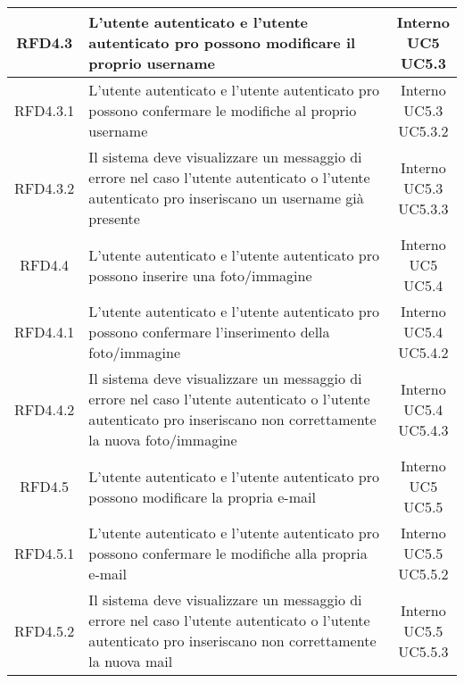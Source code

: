 \begin{longtable}{|c|>{\centering}m{7cm}|c|}
			 \hypertarget{{RFD4.3}}{{RFD4.3}} & L’utente autenticato e l’utente autenticato pro possono modificare il proprio username & \makecell{Interno\\ UC5 \\UC5.3 } \\ \hline
			 \hypertarget{{RFD4.3.1}}{{RFD4.3.1}} &  L’utente autenticato e l’utente autenticato pro possono confermare le modifiche al proprio username & \makecell{Interno\\ UC5.3 \\UC5.3.2 } \\ \hline
			 \hypertarget{{RFD4.3.2}}{{RFD4.3.2}} & Il sistema deve visualizzare un messaggio di errore nel caso l’utente autenticato o l’utente autenticato pro inseriscano un username già presente & \makecell{Interno\\ UC5.3 \\UC5.3.3 } \\ \hline
			 \hypertarget{{RFD4.4}}{{RFD4.4}} & L’utente autenticato e l’utente autenticato pro possono inserire una foto/immagine  & \makecell{Interno\\ UC5 \\UC5.4 } \\ \hline
			 \hypertarget{{RFD4.4.1}}{{RFD4.4.1}} & L’utente autenticato e l’utente autenticato pro possono confermare l’inserimento della foto/immagine & \makecell{Interno\\ UC5.4 \\UC5.4.2 } \\ \hline
			 \hypertarget{{RFD4.4.2}}{{RFD4.4.2}} & Il sistema deve visualizzare un messaggio di errore nel caso l’utente autenticato o l’utente autenticato pro inseriscano non correttamente la nuova foto/immagine & \makecell{Interno\\ UC5.4 \\UC5.4.3 } \\ \hline
			 \hypertarget{{RFD4.5}}{{RFD4.5}} & L’utente autenticato e l’utente autenticato pro possono modificare la propria e-mail  & \makecell{Interno\\ UC5 \\UC5.5 } \\ \hline
			 \hypertarget{{RFD4.5.1}}{{RFD4.5.1}} & L’utente autenticato e l’utente autenticato pro possono confermare le modifiche alla propria e-mail  & \makecell{Interno\\ UC5.5 \\UC5.5.2 } \\ \hline
			 \hypertarget{{RFD4.5.2}}{{RFD4.5.2}} & Il sistema deve visualizzare un messaggio di errore nel caso l’utente autenticato o l’utente autenticato pro inseriscano non correttamente la nuova mail & \makecell{Interno\\ UC5.5 \\UC5.5.3 } \\ \hline

\end{longtable}
